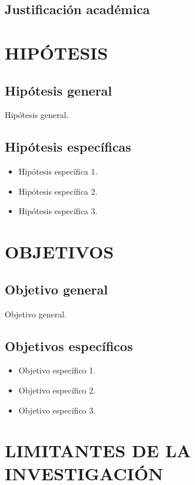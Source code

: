 \lipsum[4]

\subsection{Justificación académica}

\lipsum[5]


\section{HIPÓTESIS}

\subsection{Hipótesis general}

Hipótesis general.

\subsection{Hipótesis específicas}

\begin{itemize}
    \item Hipótesis específica 1.
    \item Hipótesis específica 2.
    \item Hipótesis específica 3.
\end{itemize}


\section{OBJETIVOS}

\subsection{Objetivo general}

Objetivo general.

\subsection{Objetivos específicos}

\begin{itemize}
    \item Objetivo específico 1.
    \item Objetivo específico 2.
    \item Objetivo específico 3.
\end{itemize}


\section{LIMITANTES DE LA INVESTIGACIÓN}

